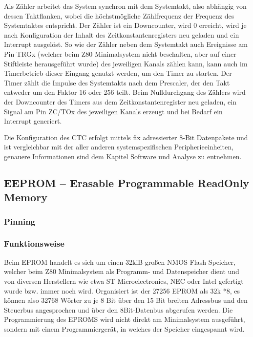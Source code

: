 Als Zähler arbeitet das System synchron mit dem Systemtakt, also abhängig von dessen Taktflanken, wobei die höchstmögliche Zählfrequenz der Frequenz des Systemtaktes entspricht. Der Zähler ist ein Downcounter, wird 0 erreicht, wird je nach Konfiguration der Inhalt des Zeitkonstantenregisters neu geladen und ein Interrupt ausgelöst. So wie der Zähler neben dem Systemtakt auch Ereignisse am Pin TRGx (welcher beim Z80 Minimalsystem nicht beschalten, aber auf einer Stiftleiste herausgeführt wurde) des jeweiligen Kanals zählen kann, kann auch im Timerbetrieb dieser Eingang genutzt werden, um den Timer zu starten. Der Timer zählt die Impulse des Systemtakts nach dem Prescaler, der den Takt entweder um den Faktor 16 oder 256 teilt. Beim Nulldurchgang des Zählers wird der Downcounter des Timers aus dem Zeitkonstantenregister neu geladen, ein Signal am Pin ZC/TOx des jeweiligen Kanals erzeugt und bei Bedarf ein Interrupt generiert.

Die Konfiguration des CTC erfolgt mittels fix adressierter 8-Bit Datenpakete und ist vergleichbar mit der aller anderen systemspezifischen Peripherieeinheiten, genauere Informationen sind dem Kapitel Software und Analyse zu entnehmen.


\subsection{EEPROM -- Erasable Programmable ReadOnly Memory}
\subsubsection{Pinning}

\subsubsection{Funktionsweise}
Beim EPROM handelt es sich um einen 32kiB großen NMOS Flash-Speicher, welcher beim Z80 Minimalsystem als Programm- und Datenspeicher dient und von diversen Herstellern wie etwa ST Microelectronics, NEC oder Intel gefertigt wurde bzw. immer noch wird. Organisiert ist der 27256 EPROM als 32k *8, es können also 32768 Wörter zu je 8 Bit über den 15 Bit breiten Adressbus und den Steuerbus angesprochen und über den 8Bit-Datenbus abgerufen werden. Die Programmierung des EPROMS wird nicht direkt am Minimalsystem ausgeführt, sondern mit einem Programmiergerät, in welches der Speicher eingespannt wird.

